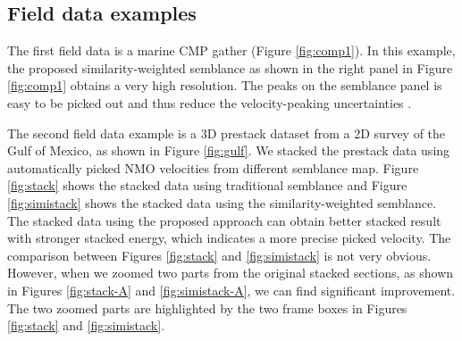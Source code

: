 \subsection{Field data examples}
The first field data is a marine CMP gather (Figure \ref{fig:comp1}). In this example, the proposed similarity-weighted semblance as shown in the right panel in Figure \ref{fig:comp1} obtains a very high resolution. The peaks on the semblance panel is easy to be picked out and thus reduce the velocity-peaking uncertainties \cite[]{fomel20141}.  

The second field data example is a 3D prestack dataset from a 2D survey of the Gulf of Mexico, as shown in Figure \ref{fig:gulf}. We stacked the prestack data using automatically picked NMO velocities from different semblance map. Figure \ref{fig:stack} shows the stacked data using traditional semblance and Figure \ref{fig:simistack} shows the stacked data using the similarity-weighted semblance. The stacked data using the proposed approach can obtain better stacked result with stronger stacked energy, which indicates a more precise picked velocity. The comparison between Figures \ref{fig:stack} and \ref{fig:simistack} is not very obvious. However, when we zoomed two parts from the original stacked sections, as shown in Figures \ref{fig:stack-A} and \ref{fig:simistack-A}, we can find significant improvement. The two zoomed parts are highlighted by the two frame boxes in Figures \ref{fig:stack} and \ref{fig:simistack}.  




